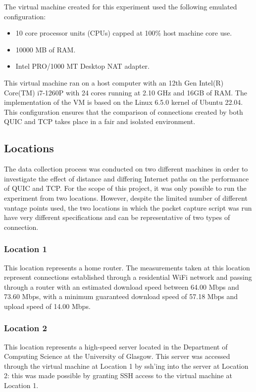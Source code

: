\documentclass{l4proj}
\begin{document}
The virtual machine created for this experiment used the following emulated configuration:
\begin{itemize}
    \item {10 core processor units (CPUs) capped at 100\% host machine core use.}
    \item {10000 MB of RAM.}
    \item {Intel PRO/1000 MT Desktop NAT adapter.}
\end{itemize}
This virtual machine ran on a host computer with an 12th Gen Intel(R) Core(TM) i7-1260P with 24 cores running at 2.10 GHz and 16GB of RAM. The implementation of the VM is based on the Linux 6.5.0 kernel of Ubuntu 22.04. This configuration ensures that the comparison of connections created by both QUIC and TCP takes place in a fair and isolated environment.

\subsection{Locations}

The data collection process was conducted on two different machines in order to investigate the effect of distance and differing Internet paths on the performance of QUIC and TCP. For the scope of this project, it was only possible to run the experiment from two locations. However, despite the limited number of different vantage points used, the two locations in which the packet capture script was run have very different specifications and can be representative of two types of connection.

\subsubsection{Location 1} This location represents a home router. The measurements taken at this location represent connections established through a residential WiFi network and passing through a router with an estimated download speed between 64.00 Mbps and 73.60 Mbps, with a minimum guaranteed download speed of 57.18 Mbps and upload speed of 14.00 Mbps.

\subsubsection{Location 2} This location represents a high-speed server located in the Department of Computing Science at the University of Glasgow. This server was accessed through the virtual machine at Location 1 by ssh'ing into the server at Location 2: this was made possible by granting SSH access to the virtual machine at Location 1.
\end{document}
